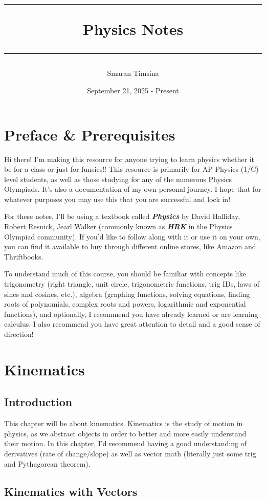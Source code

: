 \documentclass[openany]{book}
\title{
\centering
\rule{\textwidth}{2pt}
\break
{\bfseries\Huge \centering Physics Notes}
\rule{\textwidth}{2pt}
}
\author{
Smaran Timsina
}
\date{September 21, 2025 - Present}
\begin{document}
\maketitle
\tableofcontents
\chapter{Preface \& Prerequisites}
\quad Hi there! I'm making this resource for anyone trying to learn physics whether it be for a class or just for funsies!! This resource is primarily for AP Physics (1/C) level students, as well as those studying for any of the numerous Physics Olympiads. It's also a documentation of my own personal journey. I hope that for whatever purposes you may use this that you are successful and lock in! 


For these notes, I'll be using a textbook called {\bfseries\textit{Physics}} by David Halliday, Robert Resnick, Jearl Walker (commonly known as {\bfseries\textit{HRK}} in the Physics Olympiad community). If you'd like to follow along with it or use it on your own, you can find it available to buy through different online stores, like Amazon and Thriftbooks.


To understand much of this course, you should be familiar with concepts like trigonometry (right triangle, unit circle, trigonometric functions, trig IDs, laws of sines and cosines, etc.), algebra (graphing functions, solving equations, finding roots of polynomials, complex roots and powers, logarithmic and exponential functions), and optionally, I recommend you have already learned or are learning calculus. I also recommend you have great attention to detail and a good sense of direction!


\chapter{Kinematics}
\section{Introduction}
\quad This chapter will be about kinematics. Kinematics is the study of motion in physics, as we abstract objects in order to better and more easily understand their motion. In this chapter, I'd recommend having a good understanding of derivatives (rate of change/slope) as well as vector math (literally just some trig and Pythagorean theorem). 

\section{Kinematics with Vectors}
\end{document}
